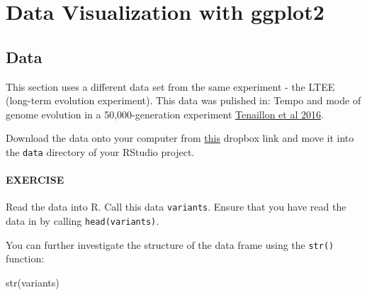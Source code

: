 \documentclass[
]{book}
\newenvironment{Shaded}{\begin{snugshade}}{\end{snugshade}}
\newcommand{\FunctionTok}[1]{\textcolor[rgb]{0.00,0.00,0.00}{#1}}
\newcommand{\NormalTok}[1]{#1}
\begin{document}
\hypertarget{data-visualization-with-ggplot2}{%
\chapter{Data Visualization with ggplot2}\label{data-visualization-with-ggplot2}}

\hypertarget{data}{%
\section{Data}\label{data}}

This section uses a different data set from the same experiment - the LTEE (long-term evolution experiment). This data was pulished in: Tempo and mode of genome evolution in a 50,000-generation experiment \href{https://www.ncbi.nlm.nih.gov/pmc/articles/PMC4988878/}{Tenaillon et al 2016}.

Download the data onto your computer from \href{https://www.dropbox.com/s/1z7qrbke9l6o6ee/combined_tidy_vcf.csv?dl=0}{this} dropbox link and move it into the \texttt{data} directory of your RStudio project.

\hypertarget{exercise}{%
\subsubsection*{EXERCISE}\label{exercise}}

Read the data into R. Call this data \texttt{variants}. Ensure that you have read the data in by calling \texttt{head(variants)}.

You can further investigate the structure of the data frame using the \texttt{str()} function:

\begin{Shaded}
\begin{Highlighting}[]
\FunctionTok{str}\NormalTok{(variants)}
\end{Highlighting}
\end{Shaded}
\end{document}
